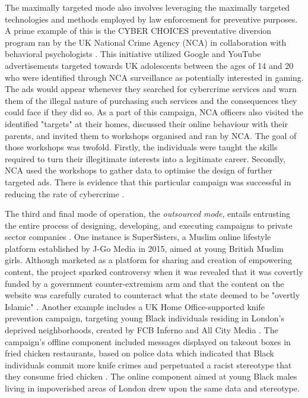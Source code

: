 \documentclass[preprint]{acmart}
\begin{document}
The maximally targeted mode also involves leveraging the maximally targeted technologies and methods employed by law enforcement for preventive purposes. A prime example of this is the CYBER CHOICES preventative diversion program ran by the UK National Crime Agency (NCA) in collaboration with behavioral psychologists \cite{Collier2022}. This initiative utilized Google and YouTube advertisements targeted towards UK adolescents between the ages of 14 and 20 who were identified through NCA surveillance as potentially interested in gaming. The ads would appear whenever they searched for cybercrime services and warn them of the illegal nature of purchasing such services and the consequences they could face if they did so. As a part of this campaign, NCA officers also visited the identified "targets" at their homes, discussed their online behaviour with their parents, and invited them to workshops organised and ran by NCA. The goal of those workshops was twofold. Firstly, the individuals were taught the skills required to turn their illegitimate interests into a legitimate career. Secondly, NCA used the workshops to gather data to optimise the design of further targeted ads. There is evidence that this particular campaign was successful in reducing the rate of cybercrime \cite{collier2021}.

The third and final mode of operation, the \textit{outsourced mode}, entails entrusting the entire process of designing, developing, and executing campaigns to private sector companies \cite{Collier2022}. One instance is SuperSisters, a Muslim online lifestyle platform established by J-Go Media in 2015, aimed at young British Muslim girls. Although marketed as a platform for sharing and creation of empowering content, the project sparked controversy when it was revealed that it was covertly funded by a government counter-extremism arm and that the content on the website was carefully curated to counteract what the state deemed to be "overtly Islamic" \cite{iqbal2019}. Another example includes a UK Home Office-supported knife prevention campaign, targeting young Black individuals residing in London's deprived neighborhoods, created by FCB Inferno and All City Media \cite{Collier2022}. The campaign's offline component included messages displayed on takeout boxes in fried chicken restaurants, based on police data which indicated that Black individuals commit more knife crimes and perpetuated a racist stereotype that they consume fried chicken \cite{webster2019}. The online component aimed at young Black males living in impoverished areas of London drew upon the same data and stereotype.
\end{document}

